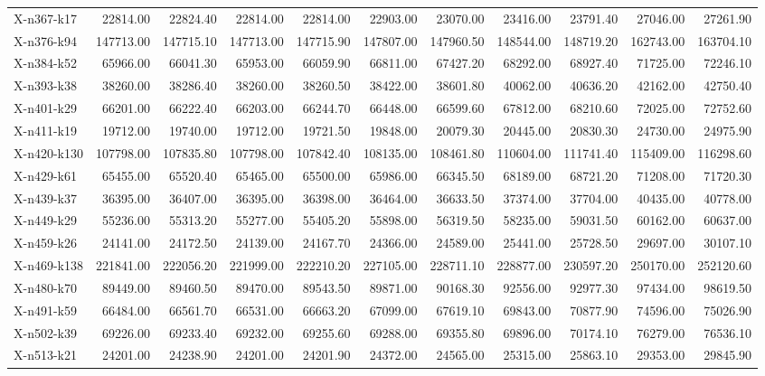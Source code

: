 \documentclass[letterpaper]{article} %
\begin{document}
\begin{longtable}{@{}l rr rr rr rr rr@{}}
X-n367-k17 & 22814.00 & 22824.40 & 22814.00 & 22814.00 & 22903.00 & 23070.00 & 23416.00 & 23791.40 & 27046.00 & 27261.90 \\
X-n376-k94 & 147713.00 & 147715.10 & 147713.00 & 147715.90 & 147807.00 & 147960.50 & 148544.00 & 148719.20 & 162743.00 & 163704.10 \\
X-n384-k52 & 65966.00 & 66041.30 & 65953.00 & 66059.90 & 66811.00 & 67427.20 & 68292.00 & 68927.40 & 71725.00 & 72246.10 \\
X-n393-k38 & 38260.00 & 38286.40 & 38260.00 & 38260.50 & 38422.00 & 38601.80 & 40062.00 & 40636.20 & 42162.00 & 42750.40 \\
X-n401-k29 & 66201.00 & 66222.40 & 66203.00 & 66244.70 & 66448.00 & 66599.60 & 67812.00 & 68210.60 & 72025.00 & 72752.60 \\
X-n411-k19 & 19712.00 & 19740.00 & 19712.00 & 19721.50 & 19848.00 & 20079.30 & 20445.00 & 20830.30 & 24730.00 & 24975.90 \\
X-n420-k130 & 107798.00 & 107835.80 & 107798.00 & 107842.40 & 108135.00 & 108461.80 & 110604.00 & 111741.40 & 115409.00 & 116298.60 \\
X-n429-k61 & 65455.00 & 65520.40 & 65465.00 & 65500.00 & 65986.00 & 66345.50 & 68189.00 & 68721.20 & 71208.00 & 71720.30 \\
X-n439-k37 & 36395.00 & 36407.00 & 36395.00 & 36398.00 & 36464.00 & 36633.50 & 37374.00 & 37704.00 & 40435.00 & 40778.00 \\
X-n449-k29 & 55236.00 & 55313.20 & 55277.00 & 55405.20 & 55898.00 & 56319.50 & 58235.00 & 59031.50 & 60162.00 & 60637.00 \\
X-n459-k26 & 24141.00 & 24172.50 & 24139.00 & 24167.70 & 24366.00 & 24589.00 & 25441.00 & 25728.50 & 29697.00 & 30107.10 \\
X-n469-k138 & 221841.00 & 222056.20 & 221999.00 & 222210.20 & 227105.00 & 228711.10 & 228877.00 & 230597.20 & 250170.00 & 252120.60 \\
X-n480-k70 & 89449.00 & 89460.50 & 89470.00 & 89543.50 & 89871.00 & 90168.30 & 92556.00 & 92977.30 & 97434.00 & 98619.50 \\
X-n491-k59 & 66484.00 & 66561.70 & 66531.00 & 66663.20 & 67099.00 & 67619.10 & 69843.00 & 70877.90 & 74596.00 & 75026.90 \\
X-n502-k39 & 69226.00 & 69233.40 & 69232.00 & 69255.60 & 69288.00 & 69355.80 & 69896.00 & 70174.10 & 76279.00 & 76536.10 \\
X-n513-k21 & 24201.00 & 24238.90 & 24201.00 & 24201.90 & 24372.00 & 24565.00 & 25315.00 & 25863.10 & 29353.00 & 29845.90 \\

\end{longtable}
\end{document}
